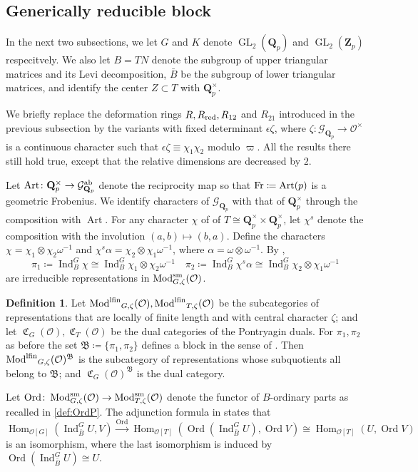\documentclass[leqno]{amsart}
\theoremstyle{definition}
\newtheorem{defn}[thm]{Definition}
\theoremstyle{remark}
\newcommand{\oo}{\mathcal{O}}
\newcommand{\Qp}{\mathbf{Q}_p}
\newcommand{\Zp}{\mathbf{Z}_p}
\DeclareMathOperator{\Hom}{Hom}
\DeclareMathOperator{\Ind}{Ind}
\DeclareMathOperator{\GL}{GL}
\DeclareMathOperator{\Art}{Art}
\newcommand{\Fr}{\textnormal{Fr}} %
\DeclareMathOperator{\Mod}{\textnormal{Mod}}
\DeclareMathOperator{\lfMod}{\textnormal{Mod}^{\textnormal{lfin}}}
\DeclareMathOperator{\fC}{\mathfrak{C}} %
\DeclareMathOperator{\Ord}{Ord} %
\newcommand{\Gp}{\mathcal{G}_{\Qp}} %
\newcommand{\B}{\mathfrak B} %
\newcommand{\sm}{\textnormal{sm}}
\newcommand{\red}{\textnormal{red}}
\begin{document}
\subsection{Generically reducible block}

In the next two subsections,
we let $G$ and  $K$
denote  $\GL_2(\Qp)$ and $\GL_2(\Zp)$
respecitvely.
We also let $B=TN$
denote the subgroup of upper triangular matrices
and its Levi decomposition,
$\bar{B}$ be
the subgroup of lower triangular matrices,
and identify the center $Z\subset T$ with $\Qp^\times$.

We briefly replace the deformation rings
$R, R_{\red}, R_{12}$ and $R_{21}$
introduced in the previous subsection
by the variants with 
fixed determinant $\epsilon\zeta$,
where $\zeta\colon \Gp\to \oo^\times$
is a continuous character 
such that  $\epsilon\zeta\equiv \chi_1\chi_2$ 
modulo $\varpi$.
All the results there
still hold true, 
except that the relative dimensions
are decreased by  $2$.

Let $\Art\colon \Qp^\times\to \Gp^{\textnormal{ab}}$
denote the reciprocity map
so that $\Fr\coloneqq \Art(p)$
is a geometric Frobenius.
We identify characters
of $\Gp$ with that of $\Qp^\times$
through the composition with $\Art$.
For any character $\chi$ of 
of $T\cong \Qp^\times\times\Qp^\times$,
let $\chi^s$
denote the composition
with the involution
$(a,b)\mapsto (b,a)$.
Define the characters
$\chi=\chi_1\otimes\chi_2\omega^{-1}$ and
$\chi^s\alpha=\chi_2\otimes \chi_1\omega^{-1}$,
where  $\alpha=\omega\otimes\omega^{-1}$.
By \cite[Thm 30]{barthel},
\[
\pi_1\coloneqq \Ind_{B}^G\chi\cong
\Ind_{B}^G\chi_1\otimes\chi_2\omega^{-1}\quad
\pi_2\coloneqq \Ind_{B}^G\chi^s\alpha\cong 
\Ind_{B}^G\chi_2\otimes\chi_1\omega^{-1} 
\]
are irreducible representations
in $\Mod^{\sm}_{G,\zeta}(\oo)$.

\begin{defn}\label{def:block}
Let $\lfMod_{G,\zeta}(\oo), \lfMod_{T,\zeta}(\oo)$
be the subcategories
of representations that are 
locally of finite length 
and with central character $\zeta$;
and let $\fC_G(\oo), \fC_T(\oo)$
be the dual categories
of the Pontryagin duals.
For $\pi_1,\pi_2$ as before
the set $\B\coloneqq\{\pi_1,\pi_2\}$ 
defines a block 
in the sense of \cite[\S 5]{pask}.
Then $\lfMod_{G,\zeta}(\oo)^\B$
is the subcategory
of representations whose subquotients
all belong to $\B$;
and $\fC_G(\oo)^\B$
is the dual category.
\end{defn}

Let $\Ord\colon \Mod_{G,\zeta}^{\sm}(\oo)
\to \Mod_{T,\zeta}^{\sm}(\oo)$
denote the functor of $B$-ordinary
parts as recalled in \eqref{def:OrdP}.
The adjunction formula
in \cite[Thm 4.4.6]{emeI} states that
\begin{equation}\label{eq:adjunct}
	\Hom_{\oo[G]}(\Ind_{\bar{B}}^GU,V)
	\xrightarrow{\Ord}
	\Hom_{\oo[T]}(\Ord(\Ind_{\bar{B}}^GU),\Ord V)
	\cong
	\Hom_{\oo[T]}(U,\Ord V)
\end{equation}
is an isomorphism, where the last isomorphism
is induced by $\Ord(\Ind_{\bar{B}}^GU)\cong U$.
\end{document}
